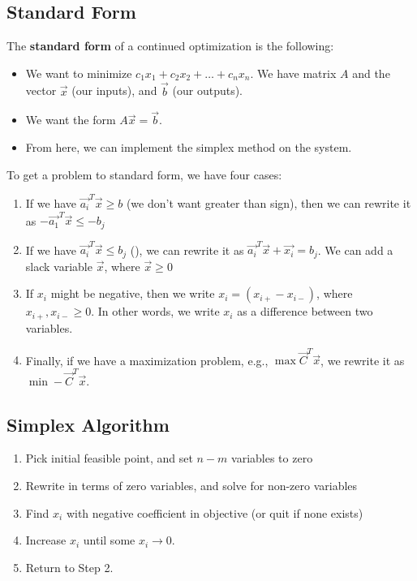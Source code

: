 \documentclass[10pt]{article}
\begin{document}
\subsection*{Standard Form}
The \textbf{standard form} of a continued optimization is the following:
\begin{itemize}
	\item We want to minimize $c_1 x_1 + c_2 x_2 + \dots + c_n x_n$.  We have matrix $A$ and the vector $\vec{x}$ (our inputs), and $\vec{b}$ (our outputs).
	\item We want the form $A\vec{x} = \vec{b}$.
	\item From here, we can implement the simplex method on the system.
\end{itemize}
To get a problem to standard form, we have four cases:
\begin{enumerate}
	\item If we have $\vec{a_i}^T \vec{x} \geq b$ (we don't want greater than sign), then we can rewrite it as $-\vec{a_1}^T \vec{x} \leq -b_j$
	\item If we have $\vec{a_i}^T \vec{x} \leq b_j$ (), we can rewrite it as $\vec{a_i}^T \vec{x} + \vec{x_i} = b_j$.  We can add a slack variable $\vec{x}$, where $\vec{x} \geq 0$
	\item If $x_i$ might be negative, then we write $x_i = (x_{i+} - x_{i-})$, where $x_{i+}, x_{i-} \geq 0$.  In other words, we write $x_i$ as a difference between two variables.
	\item Finally, if we have a maximization problem, e.g., $\max \vec{C}^T \vec{x}$, we rewrite it as $\min -\vec{C}^T \vec{x}$.
\end{enumerate}

\subsection*{Simplex Algorithm}
\begin{enumerate}
	\item Pick initial feasible point, and set $n - m$ variables to zero
	\item Rewrite in terms of zero variables, and solve for non-zero variables
	\item Find $x_i$ with negative coefficient in objective (or quit if none exists)
	\item Increase $x_i$ until some $x_i \rightarrow 0$.
	\item Return to Step 2.
\end{enumerate}
\end{document}
